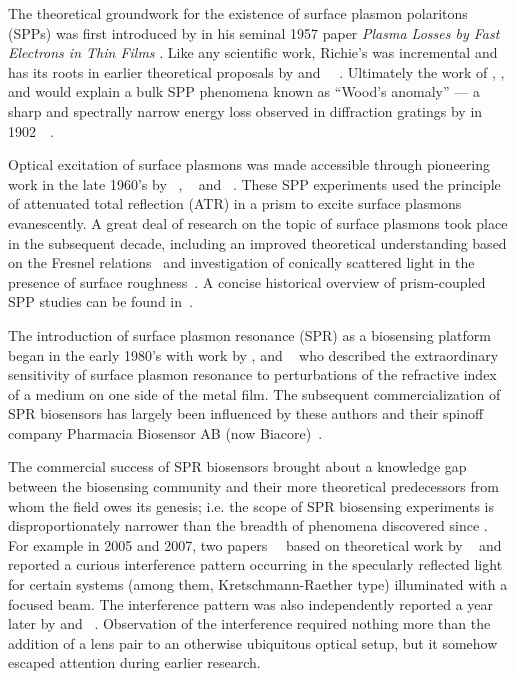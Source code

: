 The theoretical groundwork for the existence of surface plasmon polaritons
(SPPs) was first introduced by  in his seminal 1957 paper
\textit{Plasma Losses by Fast Electrons in Thin Films}
\cite{ritchie1957plasma}.  Like any scientific work, Richie's was incremental
and has its roots in earlier theoretical proposals by  and
~\cite{bohm1951collective}~\cite{pines1952collective}.  Ultimately
the work of , , and  would explain a bulk
SPP phenomena known as ``Wood's anomaly'' --- a sharp and spectrally narrow
energy loss observed in diffraction gratings by  in
1902~\cite{wood1902remarkable}~\cite{rayleigh1907remarkable}.

Optical excitation of surface plasmons was made accessible through pioneering
work in the late 1960's by ~\cite{kretschmann1968},
~\cite{raether1988springer} and
~\cite{otto1968excitation}.  These SPP experiments used the
principle of attenuated total reflection (ATR) in a prism to excite surface
plasmons evanescently.  A great deal of research on the topic of surface
plasmons took place in the subsequent decade, including an improved theoretical
understanding based on the Fresnel relations~\cite{chen1976excitation} and
investigation of conically scattered light in the presence of surface
roughness~\cite{simon1976directional}.  A concise historical overview of
prism-coupled SPP studies can be found in~\cite{raether1997surface}.

The introduction of surface plasmon resonance (SPR) as a biosensing platform
began in the early 1980's with work by ,  and
~\cite{liedberg1983surface} who described the extraordinary
sensitivity of surface plasmon resonance to perturbations of the refractive
index of a medium on one side of the metal film.  The subsequent
commercialization of SPR biosensors has largely been influenced by these
authors and their spinoff company Pharmacia Biosensor AB (now
Biacore)~\cite{liedberg1995biosensing}.

The commercial success of SPR biosensors brought about a knowledge gap between
the biosensing community and their more theoretical predecessors from whom the
field owes its genesis; i.e\@. the scope of SPR biosensing experiments is
disproportionately narrower than the breadth of phenomena discovered since
.  For example in 2005 and 2007, two
papers~\cite{andaloro2005optical}~\cite{simon2007observation} based on
theoretical work by ~\cite{chuang1986lateral} and 
\cite{chen1976excitation} reported a curious interference pattern occurring in
the specularly reflected light for certain systems (among them,
Kretschmann-Raether type) illuminated with a focused beam.  The interference
pattern was also independently reported a year later by  and
~\cite{schumann2008near}.  Observation of the interference
required nothing more than the addition of a lens pair to an otherwise
ubiquitous optical setup, but it somehow escaped attention during earlier
research.

